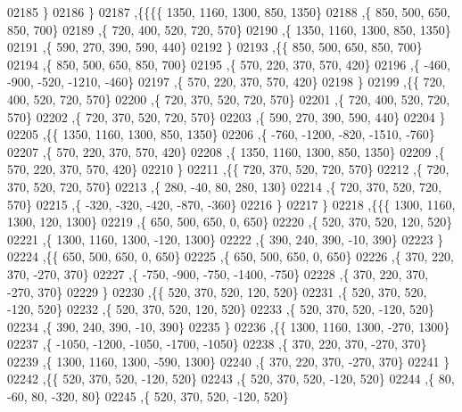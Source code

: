 \begin{DoxyCode}
02185    \}
02186   \}
02187  ,\{\{\{\{  1350,  1160,  1300,   850,  1350\}
02188     ,\{   850,   500,   650,   850,   700\}
02189     ,\{   720,   400,   520,   720,   570\}
02190     ,\{  1350,  1160,  1300,   850,  1350\}
02191     ,\{   590,   270,   390,   590,   440\}
02192     \}
02193    ,\{\{   850,   500,   650,   850,   700\}
02194     ,\{   850,   500,   650,   850,   700\}
02195     ,\{   570,   220,   370,   570,   420\}
02196     ,\{  -460,  -900,  -520, -1210,  -460\}
02197     ,\{   570,   220,   370,   570,   420\}
02198     \}
02199    ,\{\{   720,   400,   520,   720,   570\}
02200     ,\{   720,   370,   520,   720,   570\}
02201     ,\{   720,   400,   520,   720,   570\}
02202     ,\{   720,   370,   520,   720,   570\}
02203     ,\{   590,   270,   390,   590,   440\}
02204     \}
02205    ,\{\{  1350,  1160,  1300,   850,  1350\}
02206     ,\{  -760, -1200,  -820, -1510,  -760\}
02207     ,\{   570,   220,   370,   570,   420\}
02208     ,\{  1350,  1160,  1300,   850,  1350\}
02209     ,\{   570,   220,   370,   570,   420\}
02210     \}
02211    ,\{\{   720,   370,   520,   720,   570\}
02212     ,\{   720,   370,   520,   720,   570\}
02213     ,\{   280,   -40,    80,   280,   130\}
02214     ,\{   720,   370,   520,   720,   570\}
02215     ,\{  -320,  -320,  -420,  -870,  -360\}
02216     \}
02217    \}
02218   ,\{\{\{  1300,  1160,  1300,   120,  1300\}
02219     ,\{   650,   500,   650,     0,   650\}
02220     ,\{   520,   370,   520,   120,   520\}
02221     ,\{  1300,  1160,  1300,  -120,  1300\}
02222     ,\{   390,   240,   390,   -10,   390\}
02223     \}
02224    ,\{\{   650,   500,   650,     0,   650\}
02225     ,\{   650,   500,   650,     0,   650\}
02226     ,\{   370,   220,   370,  -270,   370\}
02227     ,\{  -750,  -900,  -750, -1400,  -750\}
02228     ,\{   370,   220,   370,  -270,   370\}
02229     \}
02230    ,\{\{   520,   370,   520,   120,   520\}
02231     ,\{   520,   370,   520,  -120,   520\}
02232     ,\{   520,   370,   520,   120,   520\}
02233     ,\{   520,   370,   520,  -120,   520\}
02234     ,\{   390,   240,   390,   -10,   390\}
02235     \}
02236    ,\{\{  1300,  1160,  1300,  -270,  1300\}
02237     ,\{ -1050, -1200, -1050, -1700, -1050\}
02238     ,\{   370,   220,   370,  -270,   370\}
02239     ,\{  1300,  1160,  1300,  -590,  1300\}
02240     ,\{   370,   220,   370,  -270,   370\}
02241     \}
02242    ,\{\{   520,   370,   520,  -120,   520\}
02243     ,\{   520,   370,   520,  -120,   520\}
02244     ,\{    80,   -60,    80,  -320,    80\}
02245     ,\{   520,   370,   520,  -120,   520\}

\end{DoxyCode}

